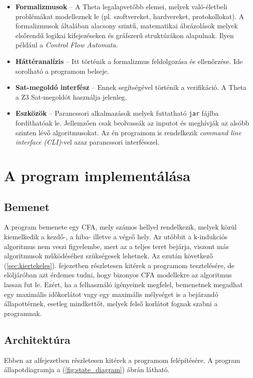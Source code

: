 \begin{itemize}
	\item \textbf{Formalizmusok} -- A Theta legalapvetőbb elemei, melyek való-életbeli problémákat modelleznek le (pl. szoftvereket, hardvereket, protokollokat). A formalizmusok általában alacsony szintű, matematikai ábrázolások melyek elsőrendű logikai kifejezéseken és gráfszerű struktúrákon alapulnak. Ilyen például a \emph{Control Flow Automata}.
	
	\item \textbf{Háttéranalízis} -- Itt történik a formalizmus feldolgozása és ellenőrzése. Ide sorolható a programom belseje.
	
	\item \textbf{Sat-megoldó interfész} -- Ennek segítségével történik a verifikáció. A Theta a Z3 Sat-megoldót használja jelenleg.
	
	\item \textbf{Eszközök} -- Parancssori alkalmazások melyek futtatható \verb+jar+ fájlba fordíthatóak le. Jellemzően csak beolvassák az inputot és meghívják az alsóbb szinten lévő algoritmusokat. Az én programom is rendelkezik \textit{command line interface (CLI)}-vel azaz parancssori interfésszel.
	
\end{itemize}

\section{A program implementálása}
\label{sec:prog_imp}

\subsection{Bemenet}
A program bemenete egy CFA, mely számos hellyel rendelkezik, melyek közül kiemelkedik a kezdő-, a hiba- illetve a végső hely. Az utóbbit a k-indukciós algoritmus nem veszi figyelembe, mert az a teljes teret bejárja, viszont más algoritmusok működéséhez szükségesek lehetnek. Az ezután következő (\ref{sec:kiertekeles}). fejezetben részletesen kitérek a programom tesztelésére, de elöljáróban azt érdemes tudni, hogy bizonyos CFA modellekre az algoritmus  lassan fut le. Ezért, ha a felhasználó igényeinek megfelel, bemenetnek megadhat egy maximális időkorlátot vagy egy maximális mélységet is a bejárandó állapottérnek, esetleg mindkettőt, melyek felső korlátot fognak szabni a programnak.

\subsection{Architektúra}
\label{sec:architektura}
Ebben az alfejezetben részletesen kitérek a programom felépítésére. A program állapotdiagramja a (\ref{fig:state_diagram}) ábrán látható.

